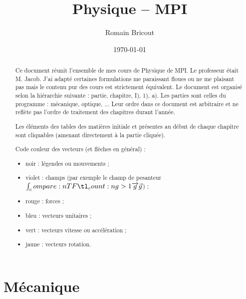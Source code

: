 \documentclass[a4paper,12pt]{report}
\title{Physique -- MPI}
\author{Romain Bricout}
\date{\today}
\newcommand{\ds}{\displaystyle}
\theoremstyle{break}
\theoremstyle{break}
\theoremstyle{break}
\theoremstyle{break}
\theoremstyle{break}
\theoremstyle{break}
\theoremstyle{break}
\theoremstyle{break}
\theoremstyle{break}
\theoremstyle{break}
\theoremstyle{break}
\theoremstyle{nonumberbreak}
\begin{document}
\renewcommand{\labelitemi}{\(\triangleright\)}
\renewcommand{\labelenumi}{(\arabic{enumi})}

\everymath{\ds}

\maketitle

\begin{abstract}
Ce document réunit l'ensemble de mes cours de Physique de MPI. Le professeur était M. Jacob. J'ai adapté certaines formulations me paraissant floues ou ne me plaisant pas mais le contenu pur des cours est strictement équivalent. Le document est organisé selon la hiérarchie suivante : partie, chapitre, I), 1), a). Les parties sont celles du programme : mécanique, optique, ... Leur ordre dans ce document est arbitraire et ne reflète pas l'ordre de traitement des chapitres durant l'année.

Les éléments des tables des matières initiale et présentes au début de chaque chapitre sont cliquables (amenant directement à la partie cliquée).

Code couleur des vecteurs (et flèches en général) : \begin{itemize}
\item noir : légendes ou mouvements ;
\item violet : champs (par exemple le champ de pesanteur \(\v{g}\)) ;
\item rouge : forces ;
\item bleu : vecteurs unitaires ;
\item vert : vecteurs vitesse ou accélération ;
\item jaune : vecteurs rotation. \\
\end{itemize}
\end{abstract}

\dominitoc\tableofcontents

\part{Mécanique}


\end{document}
